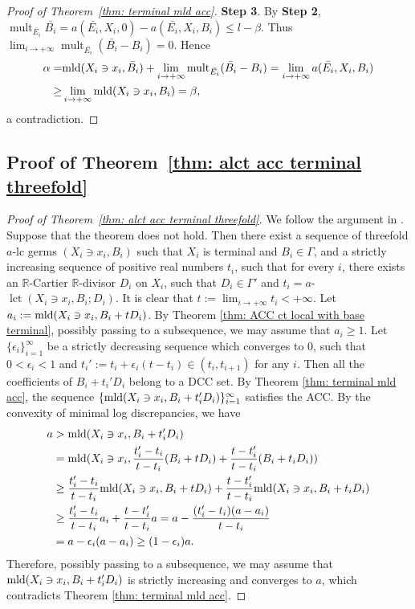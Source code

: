 \documentclass[11pt]{amsart}
\numberwithin{equation}{section}
\newcommand{\Rr}{\mathbb{R}}
\newcommand{\mld}{{\rm{mld}}}
\newcommand{\lct}{\operatorname{lct}}
\newcommand{\mult}{\operatorname{mult}}
\newcommand{\Ii}{{\Gamma}}
\theoremstyle{definition}
\theoremstyle{definition}
\begin{document}
\begin{proof}[Proof of Theorem~\ref{thm:  terminal mld acc}]
\medskip

\noindent\textbf{Step 3}.
By \textbf{Step 2}, $\mult_{\bar{E_i}}\bar {B_i}=a(\bar{E_i},X_i,0)-a(\bar{E_i},X_i,B_i)\le l-\beta$. Thus $\lim_{i\to +\infty}\mult_{\bar{E_i}}(\bar {B_i}-B_i)=0$. Hence
\begin{align*}
\alpha=&\mld(X_i\ni x_i,\bar{B_i})+\lim_{i\to+\infty}\mult_{\bar{E_i}}(\bar {B_i}-B_i)=\lim_{i\to +\infty}a(\bar{E_i},X_i,B_i)\\
\ge &\lim_{i\to +\infty}\mld(X_i\ni x_i,B_i)=\beta,
\end{align*}
a contradiction.
\end{proof}


\subsection{Proof of Theorem~\ref{thm: alct acc terminal threefold}}

\begin{proof}[Proof of Theorem~\ref{thm: alct acc terminal threefold}]
We follow the argument in \cite{BS10,HLS19}. Suppose that the theorem does not hold. Then there exist a sequence of threefold $a$-lc germs $(X_i\ni x_i,B_i)$ such that $X_i$ is terminal and $B_i\in\Ii$, and a strictly increasing sequence of positive real numbers $t_i$, such that for every $i$, there exists an $\Rr$-Cartier $\Rr$-divisor $D_i$ on $X_i$, such that $D_i\in\Ii'$ and $t_i=a$-$\lct(X_i\ni x_i,B_i;D_i)$.	It is clear that $t:=\lim_{i\rightarrow+\infty}t_i<+\infty$. Let $a_i:=\mld(X_i\ni x_i,B_i+tD_i)$. By Theorem \ref{thm: ACC ct local with base terminal}, possibly passing to a subsequence, we may assume that $a_i\ge 1$. Let $\{\epsilon_i\}_{i=1}^{\infty}$ be a strictly decreasing sequence which converges to $0$, such that $0<\epsilon_i<1$ and $t_i':=t_i+\epsilon_i(t-t_i)\in(t_i,t_{i+1})$ for any $i$. Then all the coefficients of $B_i+t_i'D_i$ belong to a DCC set. By Theorem \ref{thm:  terminal mld acc}, the sequence $\{\mld(X_i\ni x_i,B_i+t_i'D_i)\}_{i=1}^{\infty}$ satisfies the ACC. By the convexity of minimal log discrepancies, we have
	\begin{align*}
	a&> \mld(X_i\ni x_i,B_i+t_i'D_i)\\
	&=\mld(X_i\ni x_i,\frac{t_i'-t_i}{t-t_i}(B_i+tD_i)+\frac{t-t_i'}{t-t_i}(B_i+t_iD_i))\\
	&\geq\frac{t_i'-t_i}{t-t_i}\mld(X_i\ni x_i,B_i+tD_i)+\frac{t-t_i'}{t-t_i}\mld(X_i\ni x_i,B_i+t_iD_i)\\
	&\geq\frac{t_i'-t_i}{t-t_i}a_i+\frac{t-t_i'}{t-t_i}a=a-\frac{(t_i'-t_i)(a-a_i)}{t-t_i}\\
	&=a-\epsilon_i(a-a_i)\geq (1-\epsilon_i)a.
	\end{align*}
	Therefore, possibly passing to a subsequence, we may assume that $\mld(X_i\ni x_i,B_i+t_i'D_i)$ is strictly increasing and converges to $a$, which contradicts Theorem \ref{thm:  terminal mld acc}.
\end{proof}
\end{document}
